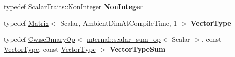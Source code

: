 \begin{DoxyCompactItemize}
typedef Scalar\+Traits\+::\+Non\+Integer {\bfseries Non\+Integer}
\item 
\mbox{\label{class_eigen_1_1_aligned_box_af2fead656b16575b24fb27216f3026ab}} 
typedef \mbox{\hyperlink{class_eigen_1_1_matrix}{Matrix}}$<$ Scalar, Ambient\+Dim\+At\+Compile\+Time, 1 $>$ {\bfseries Vector\+Type}
\item 
\mbox{\label{class_eigen_1_1_aligned_box_ab4b0120bd528cd001944f91cfe59b1bf}} 
typedef \mbox{\hyperlink{class_eigen_1_1_cwise_binary_op}{Cwise\+Binary\+Op}}$<$ \mbox{\hyperlink{struct_eigen_1_1internal_1_1scalar__sum__op}{internal\+::scalar\+\_\+sum\+\_\+op}}$<$ Scalar $>$, const \mbox{\hyperlink{class_eigen_1_1_matrix}{Vector\+Type}}, const \mbox{\hyperlink{class_eigen_1_1_matrix}{Vector\+Type}} $>$ {\bfseries Vector\+Type\+Sum}
\end{DoxyCompactItemize}
\textbf{ }\par

\textbf{ }\par

\textbf{ }\par

